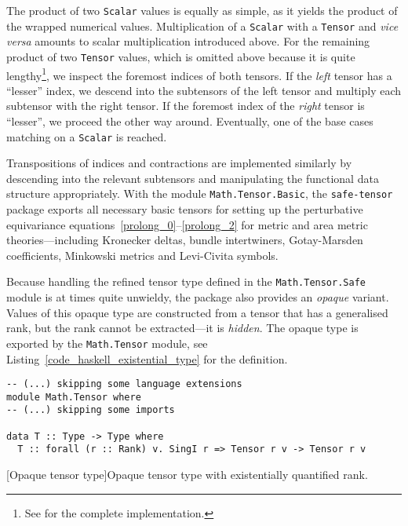 The product of two \texttt{Scalar} values is equally as simple, as it yields the product of the wrapped numerical values. Multiplication of a \texttt{Scalar} with a \texttt{Tensor} and \emph{vice versa} amounts to scalar multiplication introduced above. For the remaining product of two \texttt{Tensor} values, which is omitted above because it is quite lengthy\footnote{See \cite{Alex_2020_safe-tensor} for the complete implementation.}, we inspect the foremost indices of both tensors. If the \emph{left} tensor has a ``lesser'' index, we descend into the subtensors of the left tensor and multiply each subtensor with the right tensor. If the foremost index of the \emph{right} tensor is ``lesser'', we proceed the other way around. Eventually, one of the base cases matching on a \texttt{Scalar} is reached.

Transpositions of indices and contractions are implemented similarly by descending into the relevant subtensors and manipulating the functional data structure appropriately. With the module \texttt{Math.Tensor.Basic}, the \texttt{safe-tensor} package exports all necessary basic tensors for setting up the perturbative equivariance equations~\ref{prolong_0}--\ref{prolong_2} for metric and area metric theories---including Kronecker deltas, bundle intertwiners, Gotay-Marsden coefficients, Minkowski metrics and Levi-Civita symbols.

Because handling the refined tensor type defined in the \texttt{Math.Tensor.Safe} module is at times quite unwieldy, the package also provides an \emph{opaque} variant. Values of this opaque type are constructed from a tensor that has a generalised rank, but the rank cannot be extracted---it is \emph{hidden}. The opaque type is exported by the \texttt{Math.Tensor} module, see Listing~\ref{code_haskell_existential_type} for the definition.

\begin{code}
  \begin{verbatim}
-- (...) skipping some language extensions
module Math.Tensor where
-- (...) skipping some imports

data T :: Type -> Type where
  T :: forall (r :: Rank) v. SingI r => Tensor r v -> Tensor r v
  \end{verbatim}
  [Opaque tensor type]{Opaque tensor type with existentially quantified rank.}
  \label{code_haskell_existential_type}
\end{code}

